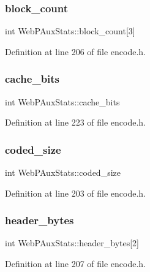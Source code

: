 \subsubsection{\texorpdfstring{block\_count}{block\_count}}
{\footnotesize\ttfamily int Web\+P\+Aux\+Stats\+::block\+\_\+count\mbox{[}3\mbox{]}}



Definition at line 206 of file encode.\+h.

\mbox{\label{struct_web_p_aux_stats_ae00af51edd1e20f2ea547b3d25e664f6}} 
\subsubsection{\texorpdfstring{cache\_bits}{cache\_bits}}
{\footnotesize\ttfamily int Web\+P\+Aux\+Stats\+::cache\+\_\+bits}



Definition at line 223 of file encode.\+h.

\mbox{\label{struct_web_p_aux_stats_a845f6cb8e702c6542c5641defd1bb06b}} 
\subsubsection{\texorpdfstring{coded\_size}{coded\_size}}
{\footnotesize\ttfamily int Web\+P\+Aux\+Stats\+::coded\+\_\+size}



Definition at line 203 of file encode.\+h.

\mbox{\label{struct_web_p_aux_stats_a995ac1cba384ab0700df9f4205b55c0f}} 
\subsubsection{\texorpdfstring{header\_bytes}{header\_bytes}}
{\footnotesize\ttfamily int Web\+P\+Aux\+Stats\+::header\+\_\+bytes\mbox{[}2\mbox{]}}



Definition at line 207 of file encode.\+h.

